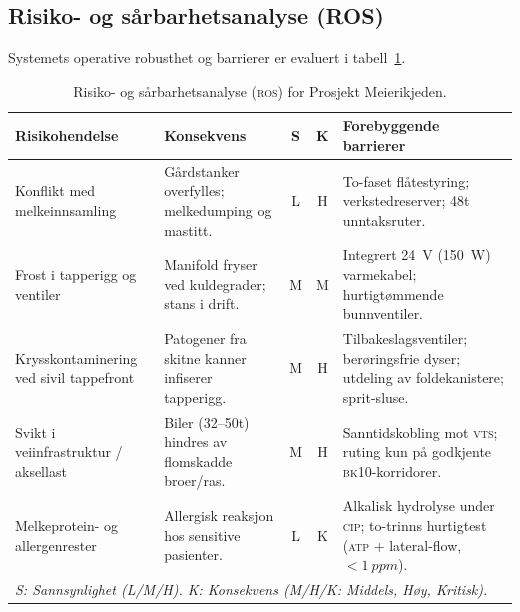 \subsection{Risiko- og sårbarhetsanalyse (ROS)}
Systemets operative robusthet og barrierer er evaluert i tabell~\ref{tab:ros}.

\begin{table}[htbp]
\centering
\footnotesize
\caption{Risiko- og sårbarhetsanalyse (\textsc{ros}) for Prosjekt Meierikjeden.}
\label{tab:ros}
\begin{tabularx}{\textwidth}{p{2.6cm}p{3.2cm}ccX}
\toprule
\textbf{Risikohendelse} & \textbf{Konsekvens} & \textbf{S} & \textbf{K} & \textbf{Forebyggende barrierer} \\
\midrule
Konflikt med melkeinnsamling & Gårdstanker overfylles; melkedumping og mastitt. & L & H & To-faset flåtestyring; verkstedreserver; 48t unntaksruter. \\
\addlinespace
Frost i tapperigg og ventiler & Manifold fryser ved kuldegrader; stans i drift. & M & M & Integrert \SI{24}{\volt} (\SI{150}{\watt}) varmekabel; hurtigtømmende bunnventiler. \\
\addlinespace
Krysskontaminering ved sivil tappefront & Patogener fra skitne kanner infiserer tapperigg. & M & H & Tilbakeslagsventiler; berøringsfrie dyser; utdeling av foldekanistere; sprit-sluse. \\
\addlinespace
Svikt i veiinfrastruktur / aksellast & Biler (32--50t) hindres av flomskadde broer/ras. & M & H & Sanntidskobling mot \textsc{vts}; ruting kun på godkjente \textsc{bk}10-korridorer. \\
\addlinespace
Melkeprotein- og allergenrester & Allergisk reaksjon hos sensitive pasienter. & L & K & Alkalisk hydrolyse under \textsc{cip}; to-trinns hurtigtest (\textsc{atp} + lateral-flow, $< \SI{1}{ppm}$). \\
\bottomrule
\multicolumn{5}{l}{\textit{S: Sannsynlighet (L/M/H). K: Konsekvens (M/H/K: Middels, Høy, Kritisk).}}
\end{tabularx}
\end{table}
